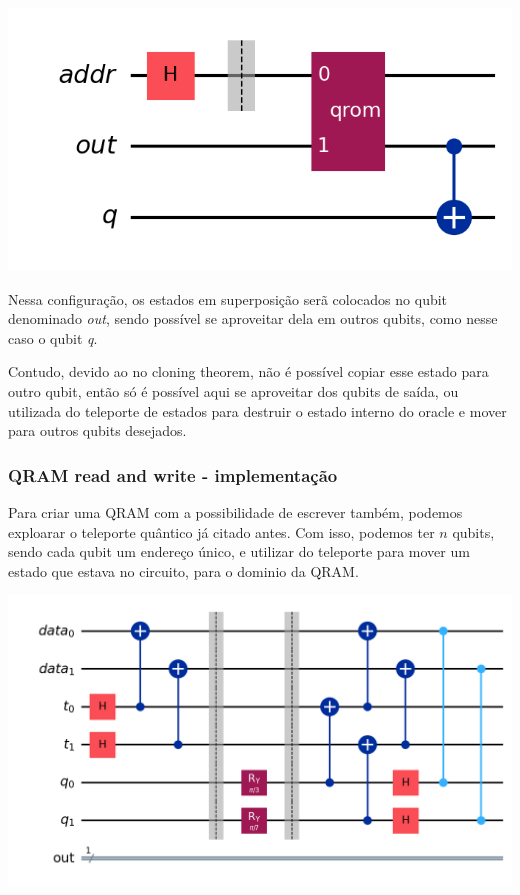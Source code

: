 \documentclass{article}
\begin{document}
\begin{center}
	\includegraphics[scale=0.5]{qrom_1_usage.png}
	\label{fig:qrom-usage}
\end{center}

Nessa configuração, os estados em superposição serã colocados no qubit denominado \emph{out}, sendo possível se aproveitar dela em outros qubits, como nesse caso o qubit \emph{q}.

Contudo, devido ao no cloning theorem, não é possível copiar esse estado para outro qubit, então só é possível aqui se aproveitar dos qubits de saída, ou utilizada do teleporte de estados para destruir o estado interno do oracle e mover para outros qubits desejados.


\subsubsection{QRAM read and write - implementação}

Para criar uma QRAM com a possibilidade de escrever também, podemos exploarar o teleporte quântico já citado antes. Com isso, podemos ter $n$ qubits, sendo cada qubit um endereço único, e utilizar do teleporte para mover um estado que estava no circuito, para o dominio da QRAM.

 \begin{center}
 	\includegraphics[scale=0.4]{qram.png}
 	\label{fig:qram}
 \end{center}
\end{document}
